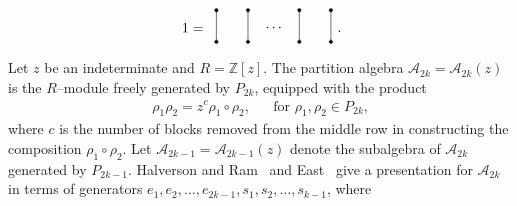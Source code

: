 \documentclass[11pt,a4paper,reqno,svgnames]{amsart}
\theoremstyle{plain}
\theoremstyle{definition}
\numberwithin{equation}{section}
\begin{document}
\begin{align*}
\begin{matrix}
\begin{tikzpicture}
\node at (-7.4,-0.45) {$\displaystyle 1= \color{black}$};
\node at (-5.35,-0.45) {$\displaystyle \cdots \color{black}$};
\draw (-6.8,0) -- (-6.8,-0.8);
\draw (-6,0) -- (-6,-0.8);
\draw (-4.7,0) -- (-4.7,-0.8);
\draw (-3.9,0) -- (-3.9,-0.8);
\filldraw [black] (-6.8,0) circle (1.2pt);
\filldraw [black] (-6.8,-0.8) circle (1.2pt);
\filldraw [black] (-6.0,0) circle (1.2pt);
\filldraw [black] (-6.0,-0.8) circle (1.2pt);
\filldraw [black] (-4.7,0) circle (1.2pt);
\filldraw [black] (-4.7,-0.8) circle (1.2pt);
\filldraw [black] (-3.9,0) circle (1.2pt);
\filldraw [black] (-3.9,-0.8) circle (1.2pt);
\end{tikzpicture}
\end{matrix}\ .
\end{align*}
Let $z$ be an indeterminate and $R=\mathbb{Z}[z]$. The partition algebra $\mathcal{A}_{2k}=\mathcal{A}_{2k}(z)$ is the $R$--module freely generated by $P_{2k}$, equipped with the product 
\begin{align*}
\rho_1\rho_2=z^{c}\rho_1\circ\rho_2,&&\text{for $\rho_1,\rho_2\in{P}_{2k}$,}
\end{align*}
where $c$ is the number of blocks removed from the middle row in constructing the composition $\rho_1\circ\rho_2$. Let $\mathcal{A}_{2k-1}=\mathcal{A}_{2k-1}(z)$ denote the subalgebra of $\mathcal{A}_{2k}$ generated by $P_{2k-1}$.  Halverson and Ram~\cite[Theorem~1.11]{MR2143201} and East~\cite[Theorem~36]{MR2811310} give a presentation for $\mathcal{A}_{2k}$ in terms of generators $e_1,e_2, \ldots,e_{2k-1},s_1, s_2,\ldots, s_{k-1}$, where 
\end{document}
